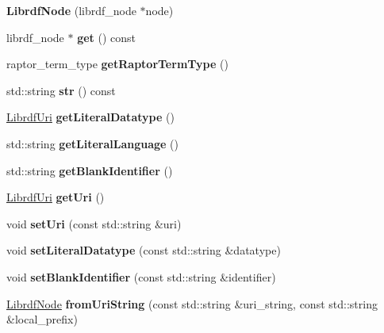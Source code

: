 \begin{DoxyCompactItemize}
\item 
\mbox{\label{classredland_1_1LibrdfNode_a200c7a67088e66d6fc73f52bdb51d2e9}} 
{\bfseries Librdf\+Node} (librdf\+\_\+node $\ast$node)
\item 
\mbox{\label{classredland_1_1LibrdfNode_a33162ea36efe451c100325816cf8613f}} 
librdf\+\_\+node $\ast$ {\bfseries get} () const
\item 
\mbox{\label{classredland_1_1LibrdfNode_a83ec604f27e71cea80ac49569a06ddfe}} 
raptor\+\_\+term\+\_\+type {\bfseries get\+Raptor\+Term\+Type} ()
\item 
\mbox{\label{classredland_1_1LibrdfNode_a535fbe1bc21ca9cd9b39b969bfd2e500}} 
std\+::string {\bfseries str} () const
\item 
\mbox{\label{classredland_1_1LibrdfNode_a98487d5af58971d820fcb99c88d8712d}} 
\hyperlink{classredland_1_1LibrdfUri}{Librdf\+Uri} {\bfseries get\+Literal\+Datatype} ()
\item 
\mbox{\label{classredland_1_1LibrdfNode_a58b9962c783be77fd0d2cb7036bfdc6a}} 
std\+::string {\bfseries get\+Literal\+Language} ()
\item 
\mbox{\label{classredland_1_1LibrdfNode_a49431de8c3262ee56d533a5fe047ee00}} 
std\+::string {\bfseries get\+Blank\+Identifier} ()
\item 
\mbox{\label{classredland_1_1LibrdfNode_a0dd2ff697c0753eddf7327f64390ed77}} 
\hyperlink{classredland_1_1LibrdfUri}{Librdf\+Uri} {\bfseries get\+Uri} ()
\item 
\mbox{\label{classredland_1_1LibrdfNode_a01aeb7675187379674746f803a1fbdc9}} 
void {\bfseries set\+Uri} (const std\+::string \&uri)
\item 
\mbox{\label{classredland_1_1LibrdfNode_a160db9f7c7636c339e12c26f519b8fff}} 
void {\bfseries set\+Literal\+Datatype} (const std\+::string \&datatype)
\item 
\mbox{\label{classredland_1_1LibrdfNode_afd81499fe4125cc2f4c472d33fb6c8c0}} 
void {\bfseries set\+Blank\+Identifier} (const std\+::string \&identifier)
\item 
\mbox{\label{classredland_1_1LibrdfNode_a8ac1d280707f4405dc8865465028ae33}} 
\hyperlink{classredland_1_1LibrdfNode}{Librdf\+Node} {\bfseries from\+Uri\+String} (const std\+::string \&uri\+\_\+string, const std\+::string \&local\+\_\+prefix)
\end{DoxyCompactItemize}
